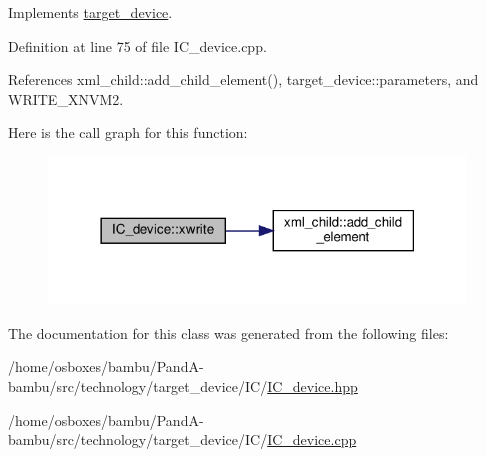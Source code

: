 Implements \hyperlink{classtarget__device_adddcd8f3eed98d93007b4ebc68be2f82}{target\+\_\+device}.



Definition at line 75 of file I\+C\+\_\+device.\+cpp.



References xml\+\_\+child\+::add\+\_\+child\+\_\+element(), target\+\_\+device\+::parameters, and W\+R\+I\+T\+E\+\_\+\+X\+N\+V\+M2.

Here is the call graph for this function\+:
\nopagebreak
\begin{figure}[H]
\begin{center}
\leavevmode
\includegraphics[width=314pt]{dc/d61/classIC__device_a9f1d0aed8216506d868bcab429fe9536_cgraph}
\end{center}
\end{figure}


The documentation for this class was generated from the following files\+:\begin{DoxyCompactItemize}
\item 
/home/osboxes/bambu/\+Pand\+A-\/bambu/src/technology/target\+\_\+device/\+I\+C/\hyperlink{IC__device_8hpp}{I\+C\+\_\+device.\+hpp}\item 
/home/osboxes/bambu/\+Pand\+A-\/bambu/src/technology/target\+\_\+device/\+I\+C/\hyperlink{IC__device_8cpp}{I\+C\+\_\+device.\+cpp}\end{DoxyCompactItemize}
